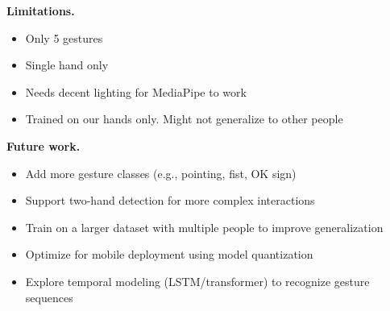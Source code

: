 \documentclass[11pt, a4paper, twocolumn]{article}
\begin{document}
\textbf{Limitations.}
\begin{itemize}
    \item Only 5 gestures
    \item Single hand only
    \item Needs decent lighting for MediaPipe to work
    \item Trained on our hands only. Might not generalize to other people
\end{itemize}

\textbf{Future work.}
\begin{itemize}
    \item Add more gesture classes (e.g., pointing, fist, OK sign)
    \item Support two-hand detection for more complex interactions
    \item Train on a larger dataset with multiple people to improve generalization
    \item Optimize for mobile deployment using model quantization
    \item Explore temporal modeling (LSTM/transformer) to recognize gesture sequences
\end{itemize}
\end{document}
